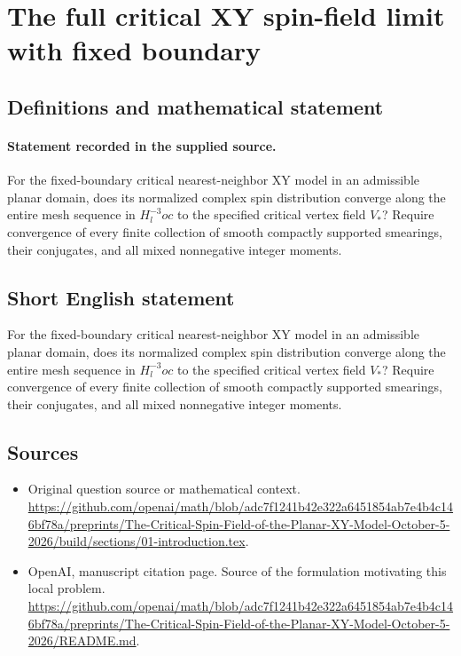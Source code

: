 \documentclass[11pt]{article}
\begin{document}
\section*{The full critical XY spin-field limit with fixed boundary}\label{30007418}
\subsection{Definitions and mathematical statement}
\paragraph{Statement recorded in the supplied source.}
For the fixed-boundary critical nearest-neighbor XY model in an admissible planar domain, does its normalized complex spin distribution converge along the entire mesh sequence in $H^{-3}_loc$ to the specified critical vertex field $V_*$? Require convergence of every finite collection of smooth compactly supported smearings, their conjugates, and all mixed nonnegative integer moments.
\subsection{Short English statement}
For the fixed-boundary critical nearest-neighbor XY model in an admissible planar domain, does its normalized complex spin distribution converge along the entire mesh sequence in $H^{-3}_loc$ to the specified critical vertex field $V_*$? Require convergence of every finite collection of smooth compactly supported smearings, their conjugates, and all mixed nonnegative integer moments.
\subsection{Sources}
\begin{itemize}
\item[S1] Original question source or mathematical context.
\url{https://github.com/openai/math/blob/adc7f1241b42e322a6451854ab7e4b4c146bf78a/preprints/The-Critical-Spin-Field-of-the-Planar-XY-Model-October-5-2026/build/sections/01-introduction.tex}.
\item[S2] OpenAI, manuscript citation page. Source of the formulation motivating this local problem.
\url{https://github.com/openai/math/blob/adc7f1241b42e322a6451854ab7e4b4c146bf78a/preprints/The-Critical-Spin-Field-of-the-Planar-XY-Model-October-5-2026/README.md}.
\end{itemize}
\end{document}
